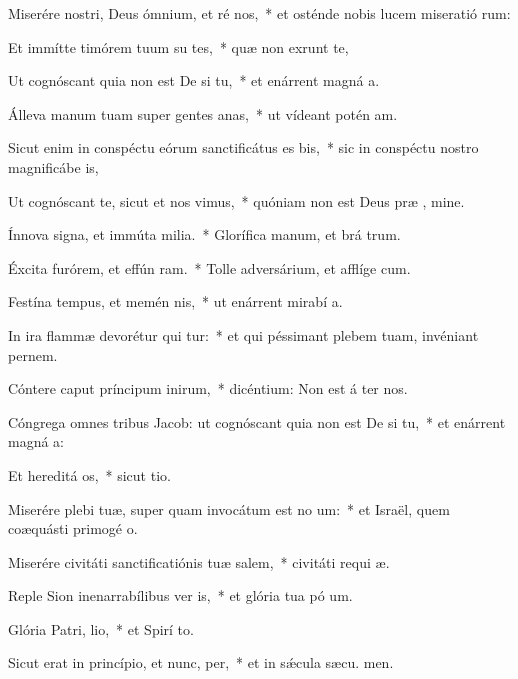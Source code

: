 \item Miserére nostri, Deus ómnium, et ré nos,~* et osténde nobis lucem miseratió rum:
\item Et immítte timórem tuum su tes,~* quæ non exrunt te,
\item Ut cognóscant quia non est De si tu,~* et enárrent magná a.
\item Álleva manum tuam super gentes anas,~* ut vídeant potén am.
\item Sicut enim in conspéctu eórum sanctificátus es  bis,~* sic in conspéctu nostro magnificábe  is,
\item Ut cognóscant te, sicut et nos vimus,~* quóniam non est Deus præ , mine.
\item Ínnova signa, et immúta milia.~* Glorífica manum, et brá trum.
\item Éxcita furórem, et effún ram.~* Tolle adversárium, et afflíge cum.
\item Festína tempus, et memén nis,~* ut enárrent mirabí a.
\item In ira flammæ devorétur qui tur:~* et qui péssimant plebem tuam, invéniant pernem.
\item Cóntere caput príncipum inirum,~* dicéntium: Non est á ter nos.
\item Cóngrega omnes tribus Jacob: ut cognóscant quia non est De si tu,~* et enárrent magná a:
\item Et hereditá os,~* sicut  tio.
\item Miserére plebi tuæ, super quam invocátum est no um:~* et Israël, quem coæquásti primogé o.
\item Miserére civitáti sanctificatiónis tuæ salem,~* civitáti requi æ.
\item Reple Sion inenarrabílibus ver is,~* et glória tua pó um.
\item Glória Patri,  lio,~* et Spirí to.
\item Sicut erat in princípio, et nunc,  per,~* et in sǽcula sæcu. men.
